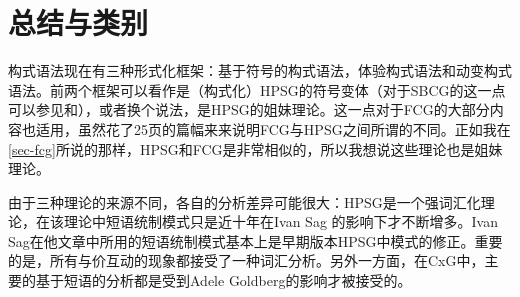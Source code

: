 \section{总结与类别}

\begin{sloppypar}
构式语法现在有三种形式化框架：基于符号的构式语法，体验构式语法和动变构式语法。前两个框架可以看作是（构式化）HPSG\indexhpsgc  的符号变体（对于SBCG的这一点可以参见和），或者换个说法，是HPSG的姐妹理论。这一点对于FCG的大部分内容也适用，虽然\citet{vanTrijp2013a}花了25页的篇幅来来说明FCG与HPSG之间所谓的不同。正如我在\ref{sec-fcg}所说的那样，HPSG和FCG是非常相似的，所以我想说这些理论也是姐妹理论。
\end{sloppypar}

由于三种理论的来源不同，各自的分析差异可能很大：HPSG是一个强词汇化理论，在该理论中短语统制模式只是近十年在Ivan Sag 的影响下才不断增多。Ivan Sag在他文章中所用的短语统制模式基本上是早期版本HPSG中模式的修正。重要的是，所有与价互动的现象都接受了一种词汇分析\citep*[\S~2.3]{SBK2012a}。另外一方面，在CxG中，主要的基于短语的分析都是受到Adele Goldberg的影响才被接受的。

